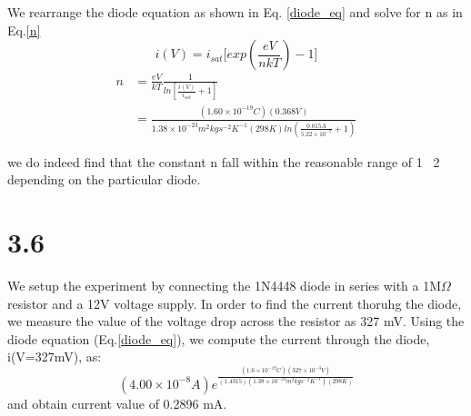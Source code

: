 \documentclass[authoryear, 12pt,5p, times]{elsarticle}
\begin{document}
\par We rearrange the diode equation as shown in Eq. \ref{diode_eq} and solve for n as in Eq.\ref{n}
\begin{equation}
i(V) = i_{sat}\Bigg[exp(\frac{eV}{nkT})-1\Bigg]
\label{diode_eq}
\end{equation}
\begin{equation}
\begin{split}
n &= \frac{eV}{kT}\frac{1}{ln[\frac{i(V)}{i_{sat}}+1]} \\&= \frac{(1.60\times10^{-19}C)(0.368V)}{1.38\times10^{-23}m^2kgs^{-2}K^{-1}(298K)ln(\frac{0.015A}{5.22\times10^{-7}}+1)}
\label{n}
\end{split}
\end{equation}



we do indeed find that the constant n fall within the reasonable range of 1~ 2  depending on the particular diode.
\section*{3.6}
We setup the experiment by connecting the 1N4448 diode in series with a 1M$\Omega$ resistor and a 12V voltage supply. In order to find the current thoruhg the diode, we measure the value of the voltage drop across the resistor as 327 mV. Using the diode equation (Eq.\ref{diode_eq}), we compute the current through the diode, i(V=327mV), as: 
\begin{equation*}
(4.00\times10^{-8}A)e^{\frac{(1.6\times10^{-19}C)(327\times10^{-3}V)}{(1.4315)(1.38\times10^{-23}m^2kgs^{-2}K^{-1})(298K)}}
\end{equation*}
and obtain current value of 0.2896 mA.
\end{document}
